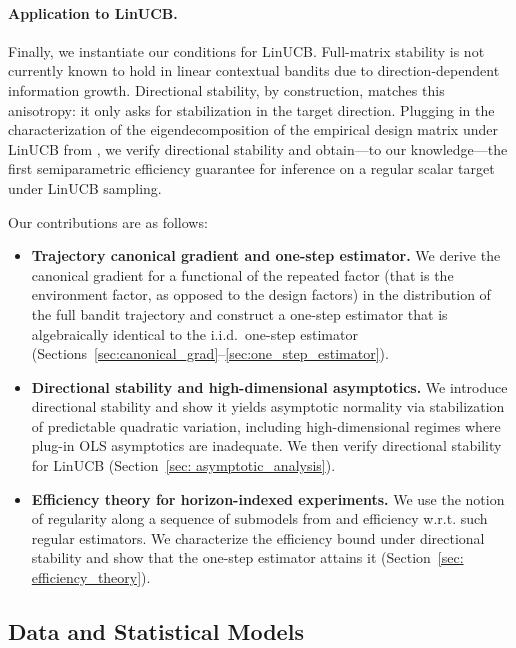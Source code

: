 \documentclass[11pt]{article}
\begin{document}
\paragraph{Application to LinUCB.}
Finally, we instantiate our conditions for LinUCB. Full-matrix stability is not currently known to hold in linear contextual bandits due to direction-dependent information growth. Directional stability, by construction, matches this anisotropy: it only asks for stabilization in the target direction. Plugging in the characterization of the eigendecomposition of the empirical design matrix under LinUCB from \cite{fan2025statisticalinferenceadaptivesampling}, we verify directional stability and obtain---to our knowledge---the first semiparametric efficiency guarantee for inference on a regular scalar target under LinUCB sampling.

Our contributions are as follows:
\begin{itemize}
    \item \textbf{Trajectory canonical gradient and one-step estimator.} We derive the canonical gradient for a functional of the repeated factor (that is the environment factor, as opposed to the design factors) in the distribution of the full bandit trajectory and construct a one-step estimator that is algebraically identical to the i.i.d.\ one-step estimator (Sections~\ref{sec:canonical_grad}--\ref{sec:one_step_estimator}).
    \item \textbf{Directional stability and high-dimensional asymptotics.} We introduce directional stability and show it yields asymptotic normality via stabilization of predictable quadratic variation, including high-dimensional regimes where plug-in OLS asymptotics are inadequate. We then verify directional stability for LinUCB (Section~\ref{sec: asymptotic_analysis}).
    \item \textbf{Efficiency theory for horizon-indexed experiments.} 
    We use the notion of regularity along a sequence of submodels from \cite{vanderlaan2026nonparametricinstrumentalvariableinference} and efficiency w.r.t. such regular estimators. We characterize the efficiency bound under directional stability and show that the one-step estimator attains it (Section~\ref{sec: efficiency_theory}). 
\end{itemize}


\subsection{Data and Statistical Models}
\end{document}
